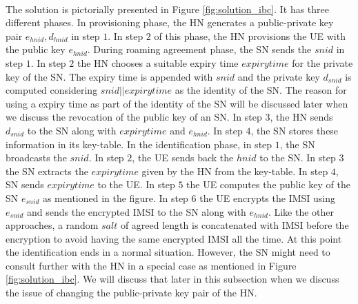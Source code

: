 \documentclass[lnicst,sechang,a4paper]{svmultln}
\begin{document}
\paragraph{}
The solution is pictorially presented in Figure \ref{fig:solution_ibc}. It has three different phases. In provisioning phase, the HN generates a public-private key pair $e_{hnid},d_{hnid}$ in step $1$. In step $2$ of this phase, the HN provisions the UE with the public key $e_{hnid}$. During roaming agreement phase, the SN sends the $snid$ in step $1$. In step $2$ the HN chooses a suitable expiry time $expirytime$ for the private key of the SN. The expiry time is appended with $snid$ and the private key $d_{snid}$ is computed considering $snid||expirytime$ as the identity of the SN. The reason for using a expiry time as part of the identity of the SN will be discussed later when we discuss the revocation of the public key of an SN. In step $3$, the HN sends $d_{snid}$ to the SN along with $expirytime$ and $e_{hnid}$. In step $4$, the SN stores these information in its key-table. In the identification phase, in step $1$, the SN broadcasts the $snid$. In step $2$, the UE sends back the $hnid$ to the SN. In step $3$ the SN extracts the $expirytime$ given by the HN from the key-table. In step $4$, SN sends $expirytime$ to the UE. In step $5$ the UE computes the public key of the SN $e_{snid}$ as mentioned in the figure. In step $6$ the UE encrypts the IMSI using $e_{snid}$ and sends the encrypted IMSI to the SN along with $e_{hnid}$. Like the other approaches, a random $salt$ of agreed length is concatenated with IMSI before the encryption to avoid having the same encrypted IMSI all the time. At this point the identification ends in a normal situation. However, the SN might need to consult further with the HN in a special case as mentioned in Figure \ref{fig:solution_ibc}. We will discuss that later in this subsection when we discuss the issue of changing the public-private key pair of the HN. 
\end{document}

